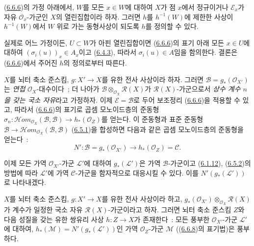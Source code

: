 \begin{corollary}[6.6.7]
\label{II.6.6.7-ko}
(\hyperref[II.6.6.6-ko]{6.6.6})의 가정 아래에서, $W$를 모든
$x\in W$에 대하여 $X$가 점 $x$에서 정규이거나
$\mathcal{E}_x$가 자유 $\mathcal{O}_x$-가군인 $X$의 열린집합이라 하자.
그러면 $h$를 $h^{-1}(W)$에 제한한 사상이 $h^{-1}(W)$에서 $W$ 위로
가는 동형사상이 되도록 $h$를 정의할 수 있다.
\end{corollary}

실제로 어느 가정이든, $U\subset W$가 아핀 열린집합이면
(\hyperref[II.6.6.6-ko]{6.6.6})의 표기 아래 모든 $x\in U$에 대하여
$(\sigma_i(u))_x\in A_x$이고
(\hyperref[II.6.4.3-ko]{6.4.3}), 따라서 $\sigma_i(u)\in A$임을
함의한다. 결론은 (\hyperref[II.6.6.6-ko]{6.6.6})에서 주어진 $h$의
정의로부터 따른다.

\begin{env}[6.6.8]
\label{II.6.6.8-ko}
$X$를 뇌터 축소 준스킴, $g:X'\to X$를 유한 전사 사상이라 하자. 그러면
$\mathcal{B}=g_*(\mathcal{O}_{X'})$는 \emph{연접}
$\mathcal{O}_X$-대수이다~; 더 나아가
$\mathcal{B}\otimes_{\mathcal{O}_X}\mathcal{R}(X)$가
$\mathcal{R}(X)$-가군으로서 \emph{상수 계수 $n$을 갖는 국소 자유}라고
가정하자. 이제 $\mathcal{E}=\mathcal{B}$로 두어 보조정리
(\hyperref[II.6.6.6-ko]{6.6.6})을 적용할 수 있고, 따라서
(\hyperref[II.6.6.6-ko]{6.6.6})의 표기로 곱셈 모노이드층의 준동형
$\sigma_n:\mathcal{H}om_{\mathcal{O}_X}(\mathcal{B},\mathcal{B})
\to h_*(\mathcal{O}_Z)$를 얻는다. 이 준동형과 표준 준동형
$\mathcal{B}\to
\mathcal{H}om_{\mathcal{O}_X}(\mathcal{B},\mathcal{B})$
(\hyperref[II.6.5.1-ko]{6.5.1})을 합성하면 다음과 같은 곱셈
모노이드층의 준동형을 얻는다~:
\[
\label{II.6.6.8.1-ko}
N':\mathcal{B}=g_*(\mathcal{O}_{X'})\longrightarrow
h_*(\mathcal{O}_Z)=\mathcal{C}.
\tag{6.6.8.1}
\]

이제 모든 가역 $\mathcal{O}_{X'}$-가군 $\mathcal{L}'$에 대하여
$g_*(\mathcal{L}')$은 가역 $\mathcal{B}$-가군이고
(\hyperref[II.6.1.12-ko]{6.1.12}),
(\hyperref[II.6.5.2-ko]{6.5.2})의 방법에 따라 $\mathcal{L}'$에 가역
$\mathcal{C}$-가군을 함자적으로 대응시킬 수 있다. 이를
$N'(g_*(\mathcal{L}'))$로 나타내겠다.
\end{env}

\begin{lemma}[6.6.9]
\label{II.6.6.9-ko}
$X$를 뇌터 축소 준스킴, $g:X'\to X$를 유한 전사 사상이라 하고,
$g_*(\mathcal{O}_{X'})\otimes_{\mathcal{O}_X}\mathcal{R}(X)$가 계수가
일정한 국소 자유 $\mathcal{R}(X)$-가군이라고 하자. 그러면 뇌터 축소
준스킴 $Z$와 다음 성질을 갖는 유한 쌍유리 사상 $h:Z\to X$가 존재한다~:
모든 풍부한 $\mathcal{O}_{X'}$-가군 $\mathcal{L}'$에 대하여,
$h_*(\mathcal{M})=N'(g_*(\mathcal{L}'))$인 가역
$\mathcal{O}_Z$-가군 $\mathcal{M}$
((\hyperref[II.6.6.8-ko]{6.6.8})의 표기법)은 풍부하다.
\end{lemma}

